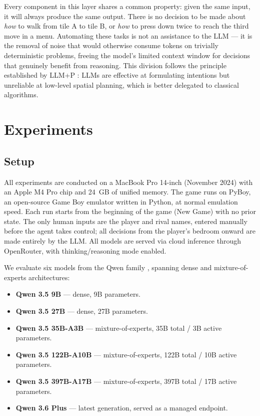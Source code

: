 \documentclass{article}
\begin{document}
Every component in this layer shares a common property: given the same input, it will always produce the same output. There is no decision to be made about \emph{how} to walk from tile A to tile B, or \emph{how} to press down twice to reach the third move in a menu. Automating these tasks is not an assistance to the LLM --- it is the removal of noise that would otherwise consume tokens on trivially deterministic problems, freeing the model's limited context window for decisions that genuinely benefit from reasoning. This division follows the principle established by LLM+P \citep{liu2023llmp}: LLMs are effective at formulating intentions but unreliable at low-level spatial planning, which is better delegated to classical algorithms.


\section{Experiments}
\label{sec:experiments}

\subsection{Setup}

All experiments are conducted on a MacBook Pro 14-inch (November 2024) with an Apple M4 Pro chip and 24~GB of unified memory. The game runs on PyBoy, an open-source Game Boy emulator written in Python, at normal emulation speed. Each run starts from the beginning of the game (New Game) with no prior state. The only human inputs are the player and rival names, entered manually before the agent takes control; all decisions from the player's bedroom onward are made entirely by the LLM. All models are served via cloud inference through OpenRouter, with thinking/reasoning mode enabled.

We evaluate six models from the Qwen family \citep{qwen3}, spanning dense and mixture-of-experts architectures:

\begin{itemize}
  \item \textbf{Qwen 3.5 9B} --- dense, 9B parameters.
  \item \textbf{Qwen 3.5 27B} --- dense, 27B parameters.
  \item \textbf{Qwen 3.5 35B-A3B} --- mixture-of-experts, 35B total / 3B active parameters.
  \item \textbf{Qwen 3.5 122B-A10B} --- mixture-of-experts, 122B total / 10B active parameters.
  \item \textbf{Qwen 3.5 397B-A17B} --- mixture-of-experts, 397B total / 17B active parameters.
  \item \textbf{Qwen 3.6 Plus} --- latest generation, served as a managed endpoint.
\end{itemize}
\end{document}
